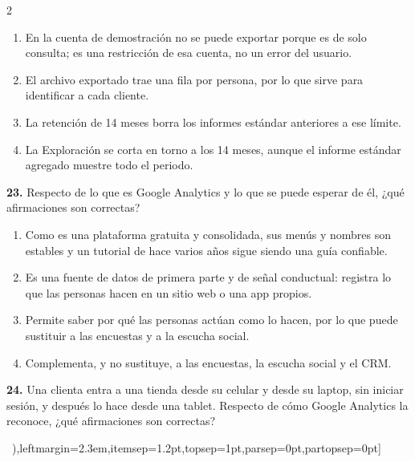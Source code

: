 \documentclass[10pt,letterpaper]{article}
\newcommand{\cas}{\framebox[1.0em]{\rule{0pt}{1.05ex}}}
\begin{document}
\begin{multicols}{2}
\begin{minipage}[t]{\columnwidth}
\vspace{1pt}\begin{enumerate}[label=\cas\ \alph*),leftmargin=2.3em,itemsep=1.2pt,topsep=1pt,parsep=0pt,partopsep=0pt]
\item En la cuenta de demostración no se puede exportar porque es de solo consulta; es una restricción de esa cuenta, no un error del usuario.
\item El archivo exportado trae una fila por persona, por lo que sirve para identificar a cada cliente.
\item La retención de 14 meses borra los informes estándar anteriores a ese límite.
\item La Exploración se corta en torno a los 14 meses, aunque el informe estándar agregado muestre todo el periodo.
\end{enumerate}\end{minipage}\par\vspace{3pt}
\begin{minipage}[t]{\columnwidth}\noindent\textbf{23.} Respecto de lo que es Google Analytics y lo que se puede esperar de él, ¿qué afirmaciones son correctas?
\vspace{1pt}\begin{enumerate}[label=\cas\ \alph*),leftmargin=2.3em,itemsep=1.2pt,topsep=1pt,parsep=0pt,partopsep=0pt]
\item Como es una plataforma gratuita y consolidada, sus menús y nombres son estables y un tutorial de hace varios años sigue siendo una guía confiable.
\item Es una fuente de datos de primera parte y de señal conductual: registra lo que las personas hacen en un sitio web o una app propios.
\item Permite saber por qué las personas actúan como lo hacen, por lo que puede sustituir a las encuestas y a la escucha social.
\item Complementa, y no sustituye, a las encuestas, la escucha social y el CRM.
\end{enumerate}\end{minipage}\par\vspace{3pt}
\begin{minipage}[t]{\columnwidth}\noindent\textbf{24.} Una clienta entra a una tienda desde su celular y desde su laptop, sin iniciar sesión, y después lo hace desde una tablet. Respecto de cómo Google Analytics la reconoce, ¿qué afirmaciones son correctas?
\vspace{1pt}\begin{enumerate}[label=\cas\ \alph*),leftmargin=2.3em,itemsep=1.2pt,topsep=1pt,parsep=0pt,partopsep=0pt]

\end{enumerate}
\end{minipage}
\end{multicols}
\end{document}
